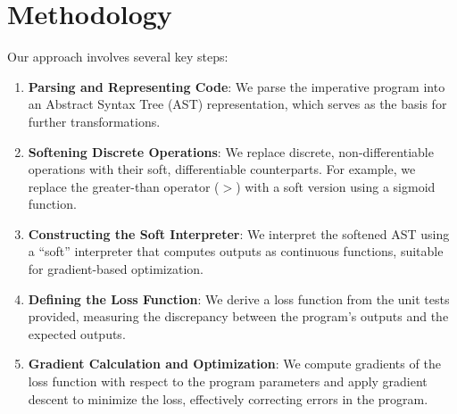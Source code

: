 \documentclass{article}
\begin{document}
\section{Methodology}
Our approach involves several key steps:
\begin{enumerate}
    \item \textbf{Parsing and Representing Code}: We parse the imperative program into an Abstract Syntax Tree (AST) representation, which serves as the basis for further transformations.

    \item \textbf{Softening Discrete Operations}: We replace discrete, non-differentiable operations with their soft, differentiable counterparts. For example, we replace the greater-than operator ($>$) with a soft version using a sigmoid function.

    \item \textbf{Constructing the Soft Interpreter}: We interpret the softened AST using a ``soft'' interpreter that computes outputs as continuous functions, suitable for gradient-based optimization.

    \item \textbf{Defining the Loss Function}: We derive a loss function from the unit tests provided, measuring the discrepancy between the program's outputs and the expected outputs.

    \item \textbf{Gradient Calculation and Optimization}: We compute gradients of the loss function with respect to the program parameters and apply gradient descent to minimize the loss, effectively correcting errors in the program.
\end{enumerate}
\end{document}
